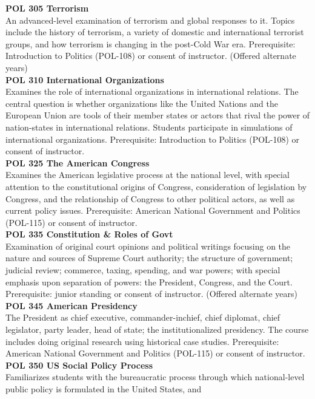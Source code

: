 \documentclass[
  letterpaper,
]{scrbook}
\begin{document}
\textbf{POL 305 Terrorism}\\
An advanced-level examination of terrorism and global responses to it.
Topics include the history of terrorism, a variety of domestic and
international terrorist groups, and how terrorism is changing in the
post-Cold War era. Prerequisite: Introduction to Politics (POL-108) or
consent of instructor. (Offered alternate years)\\
\textbf{POL 310 International Organizations}\\
Examines the role of international organizations in international
relations. The central question is whether organizations like the United
Nations and the European Union are tools of their member states or
actors that rival the power of nation-states in international relations.
Students participate in simulations of international organizations.
Prerequisite: Introduction to Politics (POL-108) or consent of
instructor.\\
\textbf{POL 325 The American Congress}\\
Examines the American legislative process at the national level, with
special attention to the constitutional origins of Congress,
consideration of legislation by Congress, and the relationship of
Congress to other political actors, as well as current policy issues.
Prerequisite: American National Government and Politics (POL-115) or
consent of instructor.\\
\textbf{POL 335 Constitution \& Roles of Govt}\\
Examination of original court opinions and political writings focusing
on the nature and sources of Supreme Court authority; the structure of
government; judicial review; commerce, taxing, spending, and war powers;
with special emphasis upon separation of powers: the President,
Congress, and the Court. Prerequisite: junior standing or consent of
instructor. (Offered alternate years)\\
\textbf{POL 345 American Presidency}\\
The President as chief executive, commander-inchief, chief diplomat,
chief legislator, party leader, head of state; the institutionalized
presidency. The course includes doing original research using historical
case studies. Prerequisite: American National Government and Politics
(POL-115) or consent of instructor.\\
\textbf{POL 350 US Social Policy Process}\\
Familiarizes students with the bureaucratic process through which
national-level public policy is formulated in the United States, and
\end{document}

